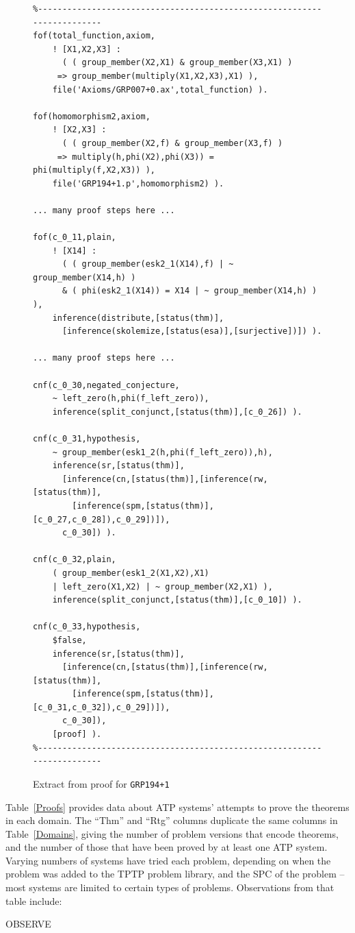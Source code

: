 \documentclass[runningheads]{llncs}
\newenvironment{packed_itemize}{
\vspace*{-0.2em}
\begin{itemize}
\setlength{\partopsep}{0pt}
\setlength{\itemsep}{1pt}
\setlength{\parskip}{0pt}
\setlength{\parsep}{0pt}
}{\end{itemize}}
\begin{document}
\begin{figure}[h!]
\centering
{\footnotesize
{\setlength{\baselineskip}{3mm}
\begin{verbatim}
%------------------------------------------------------------------------
fof(total_function,axiom,
    ! [X1,X2,X3] :
      ( ( group_member(X2,X1) & group_member(X3,X1) )
     => group_member(multiply(X1,X2,X3),X1) ),
    file('Axioms/GRP007+0.ax',total_function) ).

fof(homomorphism2,axiom,
    ! [X2,X3] :
      ( ( group_member(X2,f) & group_member(X3,f) )
     => multiply(h,phi(X2),phi(X3)) = phi(multiply(f,X2,X3)) ),
    file('GRP194+1.p',homomorphism2) ).

... many proof steps here ...

fof(c_0_11,plain,
    ! [X14] :
      ( ( group_member(esk2_1(X14),f) | ~ group_member(X14,h) )
      & ( phi(esk2_1(X14)) = X14 | ~ group_member(X14,h) ) ),
    inference(distribute,[status(thm)],
      [inference(skolemize,[status(esa)],[surjective])]) ).

... many proof steps here ...

cnf(c_0_30,negated_conjecture,
    ~ left_zero(h,phi(f_left_zero)),
    inference(split_conjunct,[status(thm)],[c_0_26]) ).

cnf(c_0_31,hypothesis,
    ~ group_member(esk1_2(h,phi(f_left_zero)),h),
    inference(sr,[status(thm)],
      [inference(cn,[status(thm)],[inference(rw,[status(thm)],
        [inference(spm,[status(thm)],[c_0_27,c_0_28]),c_0_29])]),
      c_0_30]) ).

cnf(c_0_32,plain,
    ( group_member(esk1_2(X1,X2),X1)
    | left_zero(X1,X2) | ~ group_member(X2,X1) ),
    inference(split_conjunct,[status(thm)],[c_0_10]) ).

cnf(c_0_33,hypothesis,
    $false,
    inference(sr,[status(thm)],
      [inference(cn,[status(thm)],[inference(rw,[status(thm)],
        [inference(spm,[status(thm)],[c_0_31,c_0_32]),c_0_29])]),
      c_0_30]),
    [proof] ).
%------------------------------------------------------------------------
\end{verbatim}
}}
\caption{Extract from proof for {\tt GRP194+1}}
\label{ExampleDerivationFormulae}
\end{figure}

Table~\ref{Proofs} provides data about ATP systems' attempts to prove the theorems in each domain.
The ``Thm'' and ``Rtg'' columns duplicate the same columns in Table~\ref{Domains}, giving the
number of problem versions that encode theorems, and the number of those that have been proved
by at least one ATP system.
Varying numbers of systems have tried each problem, depending on when the problem was added to
the TPTP problem library, and the SPC of the problem -- most systems are limited to certain types
of problems.
Observations from that table include:
\begin{packed_itemize}
\item OBSERVE
\end{packed_itemize}
\end{document}
